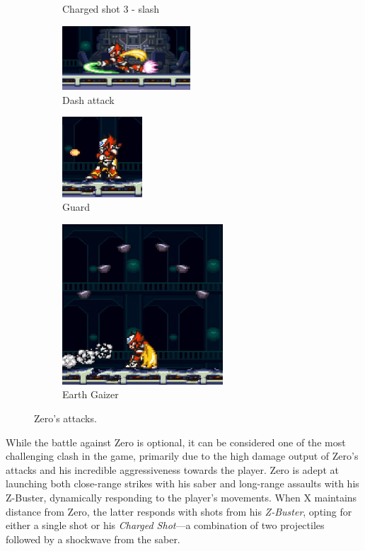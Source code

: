 \begin{figure}[htp]
\begin{subfigure}{0.45\linewidth}
		\caption{Charged shot 3 - slash}
	\end{subfigure}
	\begin{minipage}{.4\linewidth}
		\begin{subfigure}{\linewidth}
			\centering
			\includegraphics[height=2.4cm]{figures/X2/Hunter_stages/Zero_dash.png}
			\caption{Dash attack}
		\end{subfigure}	
		\begin{subfigure}{\linewidth}
			\centering
			\includegraphics[height=3cm]{figures/X2/Hunter_stages/Zero_guard.png}
			\caption{Guard}
		\end{subfigure}	
	\end{minipage}
	\begin{minipage}{.55\linewidth}
		\begin{subfigure}{\linewidth}
			\centering
			\includegraphics[height=6cm]{figures/X2/Hunter_stages/Zero_earth_gaizer.png}
			\caption{Earth Gaizer}
		\end{subfigure}	
	\end{minipage}
	\caption{Zero's attacks.}	
\end{figure}
While the battle against Zero is optional, it can be considered one of the most challenging clash in the game, primarily due to the high damage output of Zero's attacks and his incredible aggressiveness towards the player. Zero is adept at launching both close-range strikes with his saber and long-range assaults with his Z-Buster, dynamically responding to the player's movements. When X maintains distance from Zero, the latter responds with shots from his \emph{Z-Buster}, opting for either a single shot or his \emph{Charged Shot}—a combination of two projectiles followed by a shockwave from the saber.

